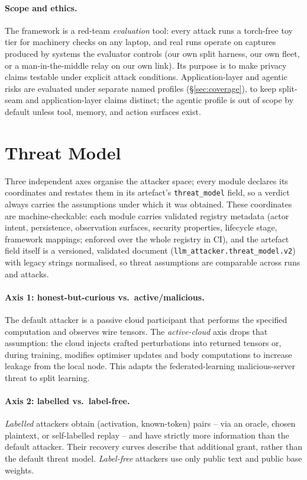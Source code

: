 \documentclass[11pt]{article}
\begin{document}
\paragraph{Scope and ethics.}
The framework is a red-team \emph{evaluation} tool: every attack runs a
torch-free toy tier for machinery checks on any laptop, and real runs
operate on captures produced by systems the evaluator controls (our own
split harness, our own fleet, or a man-in-the-middle relay on our own
link). Its purpose is to make privacy claims testable under explicit attack conditions. Application-layer and agentic risks are evaluated under
separate named profiles (\S\ref{sec:coverage}), to keep split-seam and application-layer claims distinct; the agentic profile is
out of scope by default unless tool, memory, and action surfaces exist.

\section{Threat Model}
\label{sec:threat}

Three independent axes organise the attacker space; every module declares
its coordinates and restates them in its artefact's \texttt{threat\_model}
field, so a verdict always carries the assumptions under which it was
obtained. These coordinates are machine-checkable: each
module carries validated registry metadata (actor intent, persistence,
observation surfaces, security properties, lifecycle stage, framework
mappings; enforced over the whole registry in CI), and the artefact field
itself is a versioned, validated document
(\texttt{llm\_attacker.threat\_model.v2}) with legacy strings normalised,
so threat assumptions are comparable across runs and attacks.

\paragraph{Axis 1: honest-but-curious vs.\ active/malicious.}
The default attacker is a passive cloud participant that performs the specified
computation and observes wire tensors. The \emph{active-cloud} axis drops that assumption:
the cloud injects crafted perturbations into returned tensors or, during
training, modifies optimiser updates and body computations to increase
leakage from the local node. This adapts the federated-learning
malicious-server threat to split learning.

\paragraph{Axis 2: labelled vs.\ label-free.}
\emph{Labelled} attackers obtain (activation, known-token) pairs -- via an
oracle, chosen plaintext, or self-labelled replay -- and have strictly more information than the default attacker. Their
recovery curves describe that additional grant, rather than the default
threat model. \emph{Label-free} attackers use only
public text and public base weights.
\end{document}
